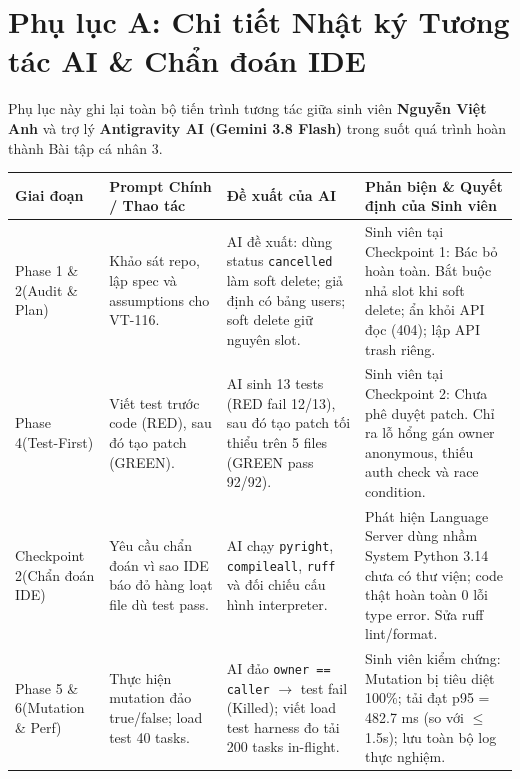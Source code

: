 \documentclass[10pt,a4paper]{article}
\newcommand{\LE}{\ensuremath{\leq}\,}
\newcommand{\hd}[1]{\sffamily\bfseries\scriptsize #1}
\begin{document}
\clearpage
\appendix
\section*{Phụ lục A: Chi tiết Nhật ký Tương tác AI \& Chẩn đoán IDE}

\begin{notebox}
\scriptsize
Phụ lục này ghi lại toàn bộ tiến trình tương tác giữa sinh viên \textbf{Nguyễn Việt Anh} và trợ lý \textbf{Antigravity AI (Gemini 3.8 Flash)} trong suốt quá trình hoàn thành Bài tập cá nhân 3.
\end{notebox}

\vspace{0.8pt}
\scriptsize
\begin{tabularx}{\linewidth}{@{}P{2.0cm}P{3.2cm}YP{3.0cm}@{}}
\toprule
{}\hd{Giai đoạn} & \hd{Prompt Chính / Thao tác} & \hd{Đề xuất của AI} & \hd{Phản biện \& Quyết định của Sinh viên} \\
\midrule
Phase 1 \& 2\newline (Audit \& Plan) & Khảo sát repo, lập spec và assumptions cho VT-116. & AI đề xuất: dùng status \texttt{cancelled} làm soft delete; giả định có bảng users; soft delete giữ nguyên slot. & Sinh viên tại Checkpoint 1: Bác bỏ hoàn toàn. Bắt buộc nhả slot khi soft delete; ẩn khỏi API đọc (404); lập API trash riêng. \\
\addlinespace[0.4pt]
Phase 4\newline (Test-First) & Viết test trước code (RED), sau đó tạo patch (GREEN). & AI sinh 13 tests (RED fail 12/13), sau đó tạo patch tối thiểu trên 5 files (GREEN pass 92/92). & Sinh viên tại Checkpoint 2: Chưa phê duyệt patch. Chỉ ra lỗ hổng gán owner anonymous, thiếu auth check và race condition. \\
\addlinespace[0.4pt]
Checkpoint 2\newline (Chẩn đoán IDE) & Yêu cầu chẩn đoán vì sao IDE báo đỏ hàng loạt file dù test pass. & AI chạy \texttt{pyright}, \texttt{compileall}, \texttt{ruff} và đối chiếu cấu hình interpreter. & Phát hiện Language Server dùng nhầm System Python 3.14 chưa có thư viện; code thật hoàn toàn 0 lỗi type error. Sửa ruff lint/format. \\
\addlinespace[0.4pt]
Phase 5 \& 6\newline (Mutation \& Perf) & Thực hiện mutation đảo true/false; load test 40 tasks. & AI đảo \texttt{owner == caller} $\rightarrow$ test fail (Killed); viết load test harness đo tải 200 tasks in-flight. & Sinh viên kiểm chứng: Mutation bị tiêu diệt 100\%; tải đạt p95 = 482.7 ms (so với \LE 1.5s); lưu toàn bộ log thực nghiệm. \\
\bottomrule
\end{tabularx}
\end{document}
